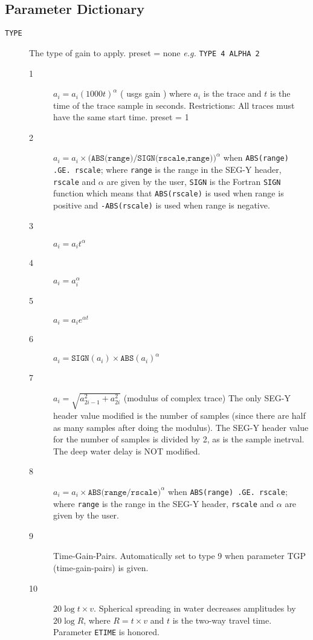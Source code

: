 \subsection{Parameter Dictionary}

\begin{description}
\item[\texttt{TYPE}] The type of gain to apply.  \Gls{preset} = none     \textit{e.g.} \texttt{TYPE 4 ALPHA 2}
\begin{description}
\item[1] $a_{i} = a_{i} (1000 t)^{\alpha}$ ( \gls{usgs} gain ) where $a_{i}$
         is the trace and $t$ is the time of the trace sample in seconds.
         Restrictions:  All traces must have the same start time.
         \Gls{preset} = 1
     \item[2] $a_{i} = a_{i} \times (\texttt{ABS(range)/SIGN(rscale,range))}^{\alpha}$ when
         \texttt{ABS(range) .GE. rscale};  where \texttt{range} is the range in the
             SEG-Y header, \texttt{rscale} and $\alpha$ are given by the user, \texttt{SIGN}
             is the Fortran \texttt{SIGN} function which means that \texttt{ABS(rscale)}
             is used when range is positive and \texttt{-ABS(rscale)} is used
             when range is negative.
\item[3] $a_{i} = a_{i} t ^{\alpha}$
\item[4] $a_{i} = a_{i}^{\alpha}$
\item[5] $a_{i} = a_{i} e^{\alpha t}$
\item[6] $a_{i} = \texttt{SIGN}(a_{i}) \times \texttt{ABS}(a_{i}) ^{\alpha}$
\item[7] $a_{i} = \sqrt{a_{2i-1}^{2} + a_{2i}^{2}}$ (modulus of complex trace)
             The only SEG-Y header value modified is the number of samples
             (since there are half as many samples after doing the modulus).
             The SEG-Y header value for the number of samples is divided
             by 2, as is the sample inetrval.
             The deep water delay is NOT modified.
         \item[8] $a_{i} = a_{i} \times \texttt{ABS(range/rscale)} ^{\alpha}$ when
             \texttt{ABS(range) .GE. rscale};  where \texttt{range} is the range in the
             SEG-Y header, \texttt{rscale} and $\alpha$ are given by the user.
\item[9] Time-Gain-Pairs.  Automatically set to type 9 when
             parameter TGP (time-gain-pairs) is given.
         \item[10]$20\log{t \times v}$.  Spherical spreading in water decreases amplitudes
             by $20 \log{R}$, where $R = t \times v$ and $t$ is the two-way travel time.
             Parameter \texttt{ETIME} is honored.
\end{description}
\end{description}

